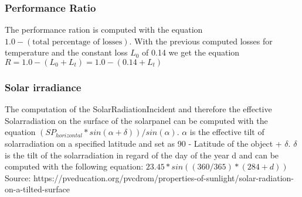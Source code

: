 \subsubsection{Performance Ratio}
The performance ration is computed with the equation $1.0 - (\text{total percentage of losses})$.
With the previous computed losses for temperature and the constant loss $L_0$ of 0.14 we get the equation $R = 1.0 - (L_0 + L_t) = 1.0 - (0.14 + L_t)$
\subsubsection{Solar irradiance}
The computation of the SolarRadiationIncident and therefore the effective Solarradiation on the surface of the solarpanel can be computed with the equation $(SP_{horizontal} * sin(\alpha + \delta))/sin(\alpha)$.
$\alpha$ is the effective tilt of solarradiation on a specified latitude and set as 90 - Latitude of the object + $\delta$.
$\delta$ is the tilt of the solarradiation in regard of the day of the year d and can be computed with the following equation: $23.45 * sin((360/365) * (284 + d))$
Source: https://pveducation.org/pvcdrom/properties-of-sunlight/solar-radiation-on-a-tilted-surface